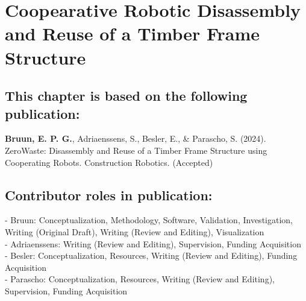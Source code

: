 
\graphicspath{{./\figurefolder/6ZeroWaste/}}

\chapter{Coopearative Robotic Disassembly and Reuse of a Timber Frame Structure}\label{chap:6_ZeroWaste}

\thispagestyle{empty}

\vfill 
\section*{\normalsize\textmd{This chapter is based on the following publication:}}
    \vspace{-0.3cm}
    \textbf{Bruun, E. P. G.}, Adriaenssens, S., Besler, E., \& Parascho, S. (2024). ZeroWaste: Disassembly and Reuse of a Timber Frame Structure using Cooperating Robots. Construction Robotics. (Accepted)


\section*{\normalsize\textmd{Contributor roles in publication:}}
    \vspace{-0.3cm}\noindent
    - Bruun: Conceptualization, Methodology, Software, Validation, Investigation, Writing (Original Draft), Writing (Review and Editing), Visualization\\
    - Adriaenssens: Writing (Review and Editing), Supervision, Funding Acquisition \\
    - Besler: Conceptualization, Resources, Writing (Review and Editing), Funding Acquisition \\
    - Parascho: Conceptualization, Resources, Writing (Review and Editing), Supervision, Funding Acquisition \\
    
